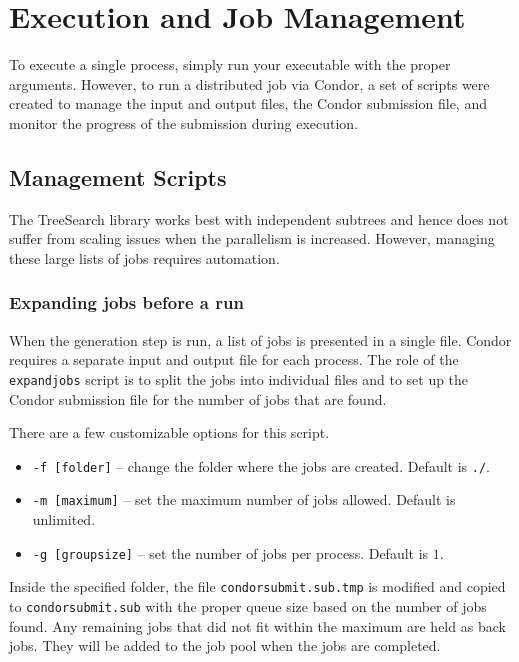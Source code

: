 \documentclass[11pt]{article}
\def\TreeSearch{{TreeSearch}}
\begin{document}
\section{Execution and Job Management}
\label{sec:Execution}

To execute a single process, simply run your executable with the proper arguments.
However, to run a distributed job via Condor, a set of scripts were created to manage
	the input and output files, the Condor submission file, and monitor the progress
	of the submission during execution.

\subsection{Management Scripts}


The {\TreeSearch} library works best with independent subtrees
	 and hence does not suffer from scaling issues when the parallelism is increased.
However, managing these large lists of jobs requires automation.

\subsubsection{Expanding jobs before a run}

When the generation step is run, a list of jobs is presented in a single file.
Condor requires a separate input and output file for each process.
The role of the \texttt{expandjobs} script is to split the jobs into individual 
	files and to set up the Condor submission file for the number of jobs that are found.

There are a few customizable options for this script.

\begin{itemize}
	\item \texttt{-f [folder]} -- change the folder where the jobs are created.  Default is \texttt{./}.
	\item \texttt{-m [maximum]} -- set the maximum number of jobs allowed.  Default is unlimited.
	\item \texttt{-g [groupsize]} -- set the number of jobs per process. Default is $1$.
\end{itemize}

Inside the specified folder, the file \texttt{condorsubmit.sub.tmp} is modified
	and copied to \texttt{condorsubmit.sub} with
	the proper queue size based on the number of jobs found.
Any remaining jobs that did not fit within the maximum are held as back jobs.
They will be added to the job pool when the jobs are completed.
\end{document}
